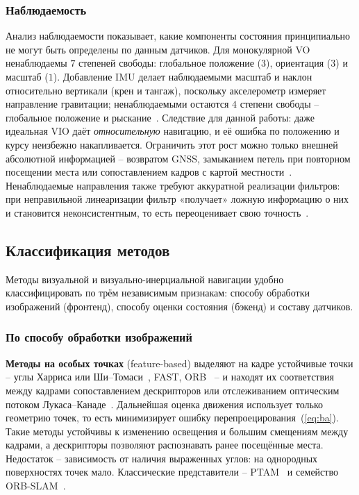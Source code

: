     \subsubsection{Наблюдаемость}
    Анализ наблюдаемости показывает, какие компоненты состояния принципиально не могут быть определены по данным датчиков.
    Для монокулярной VO ненаблюдаемы $7$ степеней свободы: глобальное положение ($3$), ориентация ($3$) и масштаб ($1$).
    Добавление IMU делает наблюдаемыми масштаб и наклон относительно вертикали (крен и тангаж), поскольку акселерометр измеряет направление гравитации; ненаблюдаемыми остаются $4$ степени свободы -- глобальное положение и рыскание~\cite{vins_consistency}.
    Следствие для данной работы: даже идеальная VIO даёт \emph{относительную} навигацию, и её ошибка по положению и курсу неизбежно накапливается.
    Ограничить этот рост можно только внешней абсолютной информацией -- возвратом GNSS, замыканием петель при повторном посещении места или сопоставлением кадров с картой местности~\cite{avl_review}.
    Ненаблюдаемые направления также требуют аккуратной реализации фильтров: при неправильной линеаризации фильтр «получает» ложную информацию о них и становится неконсистентным, то есть переоценивает свою точность~\cite{vins_consistency}.

    \subsection{Классификация методов}

    Методы визуальной и визуально-инерциальной навигации удобно классифицировать по трём независимым признакам: способу обработки изображений (фронтенд), способу оценки состояния (бэкенд) и составу датчиков.

    \subsubsection{По способу обработки изображений}

    \textbf{Методы на особых точках} (feature-based) выделяют на кадре устойчивые точки -- углы Харриса или Ши--Томаси~\cite{shi_tomasi}, FAST, ORB~\cite{orb} -- и находят их соответствия между кадрами сопоставлением дескрипторов или отслеживанием оптическим потоком Лукаса--Канаде~\cite{lucas_kanade}.
    Дальнейшая оценка движения использует только геометрию точек, то есть минимизирует ошибку перепроецирования~(\ref{eq:ba}).
    Такие методы устойчивы к изменению освещения и большим смещениям между кадрами, а дескрипторы позволяют распознавать ранее посещённые места.
    Недостаток -- зависимость от наличия выраженных углов: на однородных поверхностях точек мало.
    Классические представители -- PTAM~\cite{ptam} и семейство ORB-SLAM~\cite{orbslam, orbslam3}.

